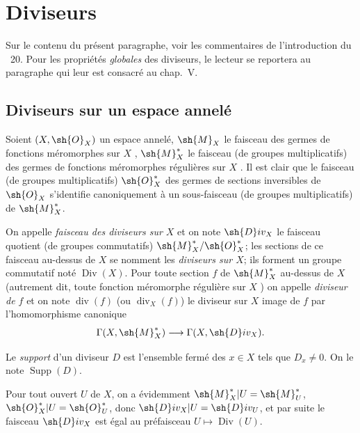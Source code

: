 \section{Diviseurs}
\label{section:IV.21}

Sur le contenu du présent paragraphe, voir les commentaires de l'introduction du \textsection~20.
Pour les propriétés \emph{globales} des diviseurs, le lecteur se reportera au paragraphe qui leur est consacré au chap.~V.

\subsection{Diviseurs sur un espace annelé}
\label{IV.21.1}

\begin{env}[21.1.1]
\label{IV.21.1.1}
Soient $(X,\sh{O}_X)$ un espace annelé, $\sh{M}_X$ le faisceau des germes de fonctions méromorphes sur $X$ , $\sh{M}_X^*$ le faisceau (de groupes multiplicatifs) des germes de fonctions méromorphes régulières sur $X$ .
Il est clair que le faisceau (de groupes multiplicatifs) $\sh{O}_X^*$ des germes de sections inversibles de $\sh{O}_X$ s'identifie canoniquement à un sous-faisceau (de groupes multiplicatifs) de $\sh{M}_X^*$.
\end{env}

\begin{definition}[21.1.2]
On appelle \emph{faisceau des diviseurs sur $X$} et on note $\sh{D}iv_X$ le faisceau quotient (de groupes commutatifs) $\sh{M}_X^*/\sh{O}_X^*$;
les sections de ce faisceau au-dessus de $X$ se nomment les \emph{diviseurs sur $X$}; ils forment un groupe commutatif noté $\operatorname{Div}(X)$.
Pour toute section $f$ de $\sh{M}_X^*$ au-dessus de $X$ (autrement dit, toute fonction méromorphe régulière sur $X$ ) on appelle \emph{diviseur de $f$} et on note $\operatorname{div}(f)$ (ou $\operatorname{div}_X(f)$) le diviseur sur $X$ image de $f$ par l'homomorphisme canonique
\[
  \Gamma(X,\sh{M}_X^*)\longrightarrow\Gamma(X,\sh{D}iv_X).
\]
\end{definition}


Le \emph{support} d'un diviseur $D$ est l'ensemble fermé des $x\in X$ tels que $D_x\neq0$.
On le note $\operatorname{Supp}(D)$.

Pour tout ouvert $U$ de $X$, on a évidemment $\sh{M}_X^*|U=\sh{M}_U^*$, $\sh{O}_X^*|U=\sh{O}_U^*$, donc $\sh{D}iv_X|U=\sh{D}iv_U$, et par suite le faisceau $\sh{D}iv_X$ est égal au préfaisceau $U\mapsto\operatorname{Div}(U)$.

